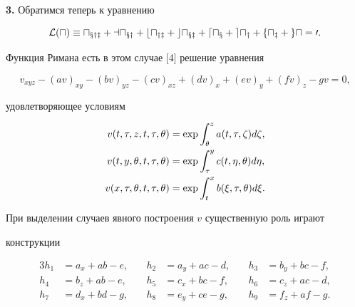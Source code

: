 \medskip





{\bf 3.} Обратимся теперь к уравнению


\begin{equation}


\cal L(u)\equiv u_{xyz}+au_{xy}+bu_{yz}+cu_{xz}+


du_x+eu_y+fu_z+gu=0.


\end{equation}


Функция Римана есть в этом случае [4] решение уравнения


\begin{equation}


v_{xyz}-(av)_{xy}-(bv)_{yz}-(cv)_{xz}+


(dv)_x+(ev)_y+(fv)_z-gv=0,


\end{equation}


удовлетворяющее условиям


\begin{align}


v(t,\tau,z,t,\tau,\theta)&=\exp\int^z_\theta


a(t,\tau,\zeta)d\zeta,\notag\\


v(t,y,\theta,t,\tau,\theta)&=\exp\int^y_\tau


c(t,\eta,\theta)d\eta,\\


v(x,\tau,\theta,t,\tau,\theta)&=\exp\int^x_t


b(\xi,\tau,\theta)d\xi.\notag


\end{align}





При выделении случаев явного построения $v$ существенную роль играют


конструкции


\begin{alignat*}{3}


h_1&=a_x+ab-e, &\quad h_2&=a_y+ac-d, &\quad h_3&=b_y+bc-f,\\


h_4&=b_z+ab-e, &\quad h_5&=c_x+bc-f, &\quad h_6&=c_z+ac-d,\\


h_7&=d_x+bd-g, &\quad h_8&=e_y+ce-g, &\quad h_9&=f_z+af-g.


\end{alignat*}


